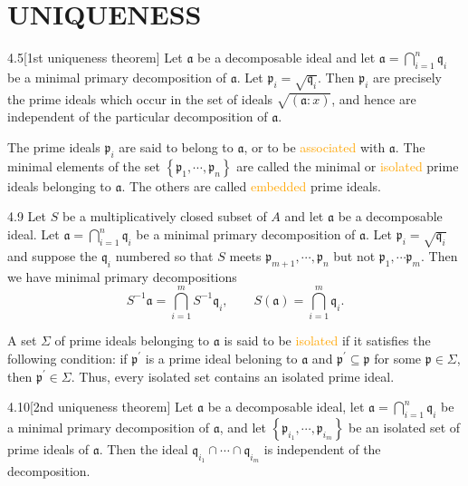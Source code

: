 \section*{UNIQUENESS}

\begin{proposition}{4.5}[1st uniqueness theorem]
	Let $\mathfrak{a}$ be a decomposable ideal and let $\mathfrak{a}=\bigcap_{i=1}^n\mathfrak{q}_i$ be a minimal primary decomposition of $\mathfrak{a}$. Let $\mathfrak{p}_i=\sqrt{\mathfrak{q}_i}$. Then $\mathfrak{p}_i$ are precisely the prime ideals which occur in the set of ideals $\sqrt{(\mathfrak{a}:x)}$, and hence are independent of the particular decomposition of $\mathfrak{a}$.
\end{proposition}

The prime ideals $\mathfrak{p}_i$ are said to belong to $\mathfrak{a}$, or to be \textcolor{orange}{associated} with $\mathfrak{a}$. The minimal elements of the set $\left\{\mathfrak{p}_1,\cdots,\mathfrak{p}_n\right\}$ are called the minimal or \textcolor{orange}{isolated} prime ideals belonging to $\mathfrak{a}$. The others are called \textcolor{orange}{embedded} prime ideals.

\begin{proposition}{4.9}
	Let $S$ be a multiplicatively closed subset of $A$ and let $\mathfrak{a}$ be a decomposable ideal. Let $\mathfrak{a}=\bigcap_{i=1}^n\mathfrak{q}_i$ be a minimal primary decomposition of $\mathfrak{a}$. Let $\mathfrak{p}_i=\sqrt{\mathfrak{q}_i}$ and suppose the $\mathfrak{q}_i$ numbered so that $S$ meets $\mathfrak{p}_{m+1},\cdots,\mathfrak{p}_n$ but not $\mathfrak{p}_1,\cdots\mathfrak{p}_m$. Then we have minimal primary decompositions
	\begin{equation*}
		S^{-1}\mathfrak{a}=\bigcap_{i=1}^mS^{-1}\mathfrak{q}_i,\qquad S(\mathfrak{a})=\bigcap_{i=1}^m\mathfrak{q}_i.
	\end{equation*}
\end{proposition}

A set $\Sigma$ of prime ideals belonging to $\mathfrak{a}$ is said to be \textcolor{orange}{isolated} if it satisfies the following condition: if $\mathfrak{p}^\prime$ is a prime ideal beloning to $\mathfrak{a}$ and $\mathfrak{p}^\prime\subseteq\mathfrak{p}$ for some $\mathfrak{p}\in\Sigma$, then $\mathfrak{p}^\prime\in\Sigma$. Thus, every isolated set contains an isolated prime ideal.

\begin{proposition}{4.10}[2nd uniqueness theorem]
	Let $\mathfrak{a}$ be a decomposable ideal, let $\mathfrak{a}=\bigcap_{i=1}^n\mathfrak{q}_i$ be a minimal primary decomposition of $\mathfrak{a}$, and let $\left\{\mathfrak{p}_{i_1},\cdots,\mathfrak{p}_{i_m}\right\}$ be an isolated set of prime ideals of $\mathfrak{a}$. Then the ideal $\mathfrak{q}_{i_1}\cap\cdots\cap\mathfrak{q}_{i_m}$ is independent of the decomposition.
\end{proposition}

